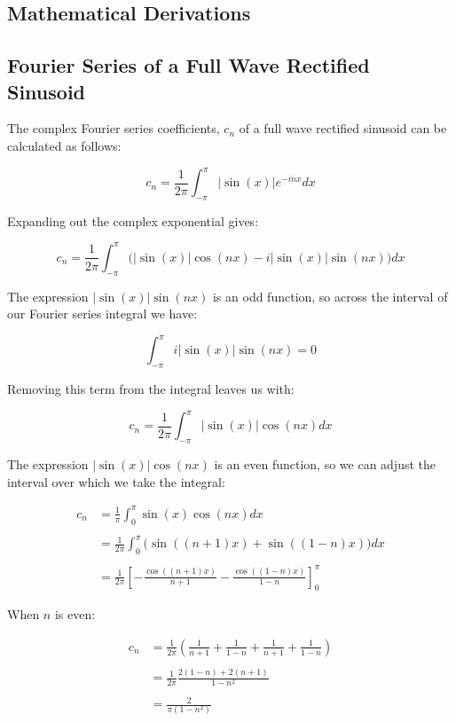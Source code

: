 \begin{appendices}
\chapter{Mathematical Derivations}
\label{app:MathematicalDerivations}
	\section{Fourier Series of a Full Wave Rectified Sinusoid}
	\label{app:MathematicalDerivations-Rectification}
		The complex Fourier series coefficients, $c_{n}$ of a full wave rectified sinusoid can be calculated as
		follows:

		\[ c_{n} = \frac{1}{2\pi} \int_{-\pi}^{\pi} |\sin(x)|e^{-inx} dx \]

		Expanding out the complex exponential gives:

		\[ c_{n} = \frac{1}{2\pi} \int_{-\pi}^{\pi} \bigl( |\sin(x)|\cos(nx) - i|\sin(x)|\sin(nx) \bigr) dx \]

		The expression $|\sin(x)|\sin(nx)$ is an odd function, so across the interval of our Fourier series integral
		we have:

		\[ \int_{-\pi}^{\pi} i|\sin(x)|\sin(nx) = 0 \]

		Removing this term from the integral leaves us with:

		\[ c_{n} = \frac{1}{2\pi} \int_{-\pi}^{\pi} |\sin(x)|\cos(nx) dx \]

		The expression $|\sin(x)|\cos(nx)$ is an even function, so we can adjust the interval over which we take the
		integral:

		\begin{align}
			c_{n} & = \frac{1}{\pi} \int_{0}^{\pi} \sin(x)\cos(nx) dx \nonumber \\
			\nonumber \\
			& = \frac{1}{2\pi} \int_{0}^{\pi} \bigl( \sin((n+1)x) + \sin((1-n)x) \bigr) dx \nonumber \\
			\nonumber \\
			& = \frac{1}{2\pi} \left[ -\frac{\cos((n+1)x)}{n+1} - 
				\frac{\cos((1-n)x)}{1-n} \right]_{0}^{\pi} \nonumber
		\end{align}

		When $n$ is even:

		\begin{align}
			c_{n} & = \frac{1}{2\pi} \left( \frac{1}{n+1} + \frac{1}{1-n} 
				+ \frac{1}{n+1} + \frac{1}{1-n} \right) \nonumber \\
			\nonumber \\
			& = \frac{1}{2\pi} \frac{2(1-n) + 2(n+1)}{1 - n^{2}} \nonumber \\
			\nonumber \\
			& = \frac{2}{\pi(1 - n^{2})} \nonumber
		\end{align}


\end{appendices}
